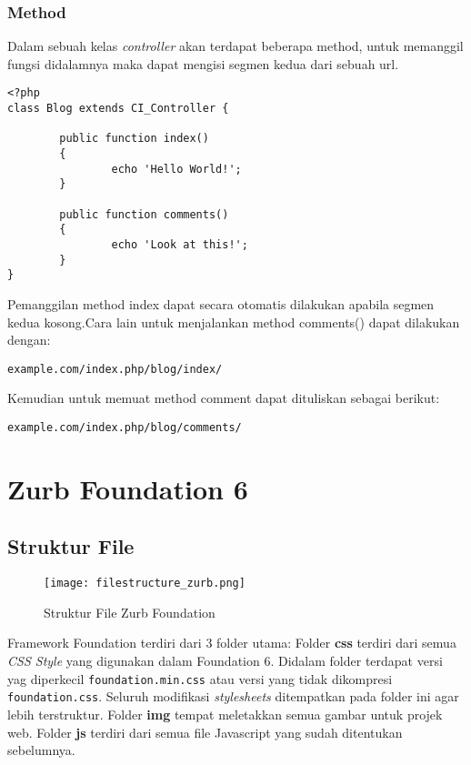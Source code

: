 \subsubsection{Method}
\label{sssec:controller_1}
Dalam sebuah kelas \textit{controller} akan terdapat beberapa method, untuk memanggil fungsi didalamnya maka dapat mengisi segmen kedua dari sebuah url. \cite{codeigniter:17}
\begin{lstlisting}[frame=single] 
<?php
class Blog extends CI_Controller {

        public function index()
        {
                echo 'Hello World!';
        }

        public function comments()
        {
                echo 'Look at this!';
        }
}
\end{lstlisting}

Pemanggilan method index dapat secara otomatis dilakukan apabila segmen kedua kosong.Cara lain untuk menjalankan method comments() dapat dilakukan dengan:
\begin{lstlisting}[frame=single] 
example.com/index.php/blog/index/
\end{lstlisting}

Kemudian untuk memuat method comment dapat dituliskan sebagai berikut:
\begin{lstlisting}[frame=single] 
example.com/index.php/blog/comments/
\end{lstlisting}

\section{Zurb Foundation 6}
\label{sec:zurb_foundation6}

\subsection{Struktur File}
\label{subs:strukturfile_zurb}
\begin{figure} [H]
	\centering  
	\texttt{[image: filestructure\_zurb.png]}  
	\caption{Struktur File Zurb Foundation}
	\label{fig:filestructure_zurb} 
\end{figure}

Framework Foundation terdiri dari 3 folder utama:
Folder \textbf{css} terdiri dari semua \textit{CSS Style} yang digunakan dalam Foundation 6. Didalam folder terdapat versi yag diperkecil \verb|foundation.min.css| atau versi yang tidak dikompresi \verb|foundation.css|. Seluruh modifikasi \textit{stylesheets} ditempatkan pada folder ini agar lebih terstruktur.
Folder \textbf{img} tempat meletakkan semua gambar untuk projek web.
Folder \textbf{js} terdiri dari semua file Javascript yang sudah ditentukan sebelumnya.\cite{zurbfoundation:17}

